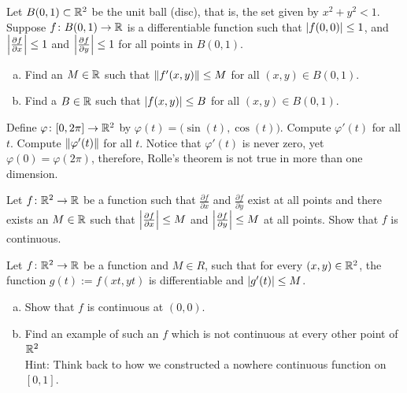 \begin{exercise}
Let $B(0,1) \subset {\mathbb{R}}^2$ be the unit ball (disc), that is, the set given by
$x^2 + y^2 < 1$.
Suppose $f \colon B(0,1) \to {\mathbb{R}}$ is a differentiable function
such that $\lvert {f(0,0)} \rvert \leq 1$,
and 
$\left\lvert {\frac{\partial f}{\partial x}} \right\rvert \leq 1$ and
$\left\lvert {\frac{\partial f}{\partial y}} \right\rvert \leq 1$ for all
points in $B(0,1)$.
\begin{enumerate}[a)]
\item
Find an $M \in {\mathbb{R}}$ such that $\lVert {f'(x,y)} \rVert \leq M$
for all $(x,y) \in
B(0,1)$.
\item
Find a $B \in {\mathbb{R}}$ such that
$\lvert {f(x,y)} \rvert \leq B$
for all $(x,y) \in
B(0,1)$.
\end{enumerate}
\end{exercise}

\begin{exercise}
Define $\varphi \colon [0,2\pi] \to {\mathbb{R}}^2$ by $\varphi(t) =
\bigl(\sin(t),\cos(t)\bigr)$.  Compute $\varphi'(t)$ for all $t$.  Compute
$\lVert {\varphi'(t)} \rVert$ for all $t$.  Notice that $\varphi'(t)$ is never zero,
yet $\varphi(0) = \varphi(2\pi)$, therefore, Rolle's theorem is not true
in more than one dimension.
\end{exercise}

\begin{exercise}
Let $f \colon {\mathbb{R}}^2 \to {\mathbb{R}}$ be a function such that
$\frac{\partial f}{\partial x}$ and
$\frac{\partial f}{\partial y}$ exist at all points and there exists an $M
\in {\mathbb{R}}$
such that 
$\left\lvert {\frac{\partial f}{\partial x}} \right\rvert \leq M$ and
$\left\lvert {\frac{\partial f}{\partial y}} \right\rvert \leq M$ at all points.  Show that $f$
is continuous.
\end{exercise}

\begin{samepage}
\begin{exercise}
Let $f \colon {\mathbb{R}}^2 \to {\mathbb{R}}$ be a function and
$M \in R$, such that
for every $(x,y) \in {\mathbb{R}}^2$, the function $g(t) := f(xt,yt)$ is
differentiable
and $\lvert {g'(t)} \rvert \leq M$.
\begin{enumerate}[a)]
\item
Show that $f$ is continuous at $(0,0)$.
\item
Find an example of such an $f$ which is not continuous at every other point of
${\mathbb{R}}^2$\\
Hint: Think back to how we constructed a nowhere continuous function on $[0,1]$.
\end{enumerate}
\end{exercise}
\end{samepage}

